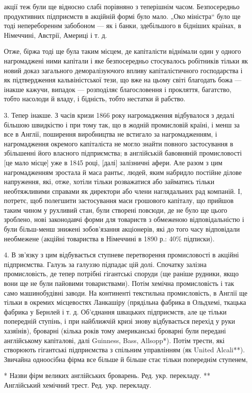 \parcont{}  %
акції теж були ще відносно слабі порівняно з теперішнім часом. Безпосередньо продуктивних підприємств в акційній формі було
мало. „Око міністра“ було ще тоді неперебореннм забобоном — як і банки, здебільшого в бідніших країнах, в Німеччині,
Австрії, Америці і т. д.

Отже, біржа тоді ще була таким місцем, де капіталісти віднімали один у одного нагромаджені ними
капітали і яке безпосередньо стосувалось робітників тільки як новий доказ загального деморалізуючого впливу капіталістичного
господарства і як підтвердження кальвіністської тези, що вже на цьому світі благодать божа — інакше кажучи, випадок —
розподіляє благословення і прокляття, багатство, тобто насолоди й владу, і бідність, тобто нестатки й рабство.

3. Тепер інакше. З часів кризи 1866 року нагромадження відбувалося з дедалі більшою швидкістю і при тому так, що в жодній промисловій
країні, і менш за все в Англії, поширення виробництва не встигало за нагромадженням, і нагромадження окремого капіталіста не
могло знайти повного застосування в збільшенні його власного підприємства; в англійській бавовняній промисловості [це мало
місце] уже в 1845 році, [далі] залізничні афери. Але разом з цим нагромадженням зростала й маса рантьє, людей, яким набридло
постійне ділове напруження, які, отже, хотіли тільки розважатися або займатись тільки необтяжливими справами як директори
або члени наглядальних рад компаній. І, потретє, щоб полегшити застосування маси грошового капіталу, що прийшов таким чином
у рухливий стан, були створені повсюди, де не було ще цього зроблено, нові законодавчі форми для товариств з обмеженою
відповідальністю і були більш-менш знижені зобов’язання акціонерів, які до того часу відповідали необмежене (акційні
товариства в Німеччині в 1890 р.: 40\% підписки).

4. В зв’язку з цим відбувається ступневе перетворення промисловості в акційні підприємства. Галузь за галуззю підпадає цій
долі. Спочатку залізна промисловість, де тепер потрібні гігантські споруди (ще раніше рудники, якщо вони ще не були пайовими
товариствами). Потім хемічна промисловість і так само машинобудівні заводи. На континенті текстильна промисловість, в Англії
ще тільки в окремих місцевостях Ланкашіру (прядільна фабрика в Ольдхемі, ткацька фабрика у Бернлей і т. д. Об’єднання
швацьких підприємств, але це тільки попередній ступінь, і при найближчій кризі знову відбувається перехід у руки хазяїнів),
броварні (кілька років тому американські броварні були передані англійському капіталові, далі Guinness, Bass,  Allsopp*).
Потім трести, які створюють гігантські підприємства з спільним управлінням (як United Alcali**). Звичайна одноосібна фірма
все більше й більше стає тільки попереднім ступенем,

* Назви фірм великих англійських броварень. Ред. укр. перекладу.
** Англійський хемічний трест. Ред. укр. перекладу.
\parbreak{}  %
